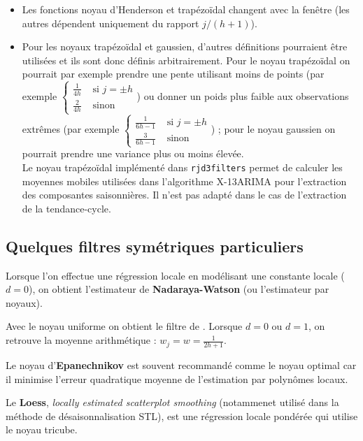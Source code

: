 \documentclass[
  12pt,
  a4paper,french]{article}
\newcommand\1{\mathds{1}}
\begin{document}
\begin{itemize}
\item
  Les fonctions noyau d'Henderson et trapézoïdal changent avec la fenêtre (les autres dépendent uniquement du rapport \(j/(h+1)\)).
\item
  Pour les noyaux trapézoïdal et gaussien, d'autres définitions pourraient être utilisées et ils sont donc définis arbitrairement.
  Pour le noyau trapézoïdal on pourrait par exemple prendre une pente utilisant moins de points (par exemple \(\begin{cases}\frac{1}{4h} &\text{ si }j=\pm h \\ \frac{2}{4h}& \text{ sinon}\end{cases}\)) ou donner un poids plus faible aux observations extrêmes (par exemple \(\begin{cases}\frac{1}{6h-1} &\text{ si }j=\pm h \\ \frac{3}{6h-1}& \text{ sinon}\end{cases}\)) ; pour le noyau gaussien on pourrait prendre une variance plus ou moins élevée.\\
  Le noyau trapézoïdal implémenté dans \texttt{rjd3filters} permet de calculer les moyennes mobiles utilisées dans l'algorithme X-13ARIMA pour l'extraction des composantes saisonnières.
  Il n'est pas adapté dans le cas de l'extraction de la tendance-cycle.
\end{itemize}

\hypertarget{sec-sympolyfilter}{%
\subsection{Quelques filtres symétriques particuliers}\label{sec-sympolyfilter}}

Lorsque l'on effectue une régression locale en modélisant une constante locale (\(d=0\)), on obtient l'estimateur de \textbf{Nadaraya-Watson} (ou l'estimateur par noyaux).

Avec le noyau uniforme on obtient le filtre de \textcite{macaulay1931smoothing}.
Lorsque \(d=0\) ou \(d=1\), on retrouve la moyenne arithmétique : \(w_j=w=\frac{1}{2h+1}\).

Le noyau d'\textbf{Epanechnikov} est souvent recommandé comme le noyau optimal car il minimise l'erreur quadratique moyenne de l'estimation par polynômes locaux.

Le \textbf{Loess}, \emph{locally estimated scatterplot smoothing} (notammenet utilisé dans la méthode de désaisonnalisation STL), est une régression locale pondérée qui utilise le noyau tricube.
\end{document}
